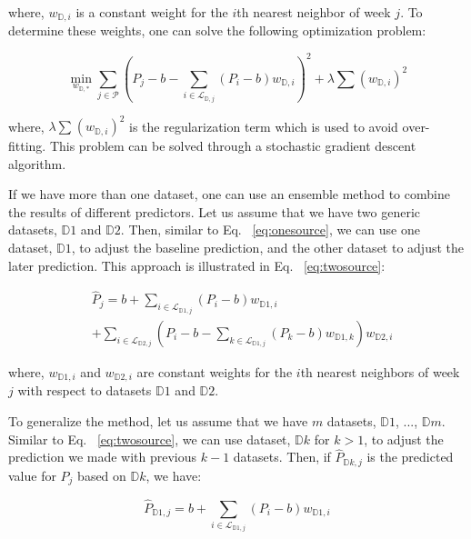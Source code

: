 where, $w_{\mathbb{D},i}$ is a constant weight for the $i$th nearest neighbor of week $j$. To determine these weights, one can solve the following optimization problem:

\begin{equation}
\min_{w_{\mathbb{D},*}} \sum_{j \in \mathcal{P}} {(P_j - b - \sum_{i \in \mathcal{L}_{\mathbb{D},j}}{} (P_i - b)w_{\mathbb{D},i})^2} + \lambda \sum_{}{}{{(w_{\mathbb{D},i})}^2}
\end{equation}

where, $\lambda \sum_{}{}{{(w_{\mathbb{D},i})}^2}$ is the regularization term which is used to avoid over-fitting. This problem can be solved through a stochastic gradient descent algorithm.

If we have more than one dataset, one can use an ensemble method to combine the results of different predictors. Let us assume that we have two generic datasets, $\mathbb{D}1$ and $\mathbb{D}2$. Then, similar to Eq. ~\ref{eq:onesource}, we can use one dataset, $\mathbb{D}1$, to adjust the baseline prediction, and the other dataset to adjust the later prediction. This approach is illustrated in Eq. ~\ref{eq:twosource}:

\begin{equation}
\begin{array}{ll}
& \hat{P}_{j} =  b + \sum_{i \in \mathcal{L}_{\mathbb{D}1,j}}{} (P_i - b)w_{\mathbb{D}1,i} \\
 & + \sum_{i \in \mathcal{L}_{\mathbb{D}2,j}}{} (P_i - b - \sum_{k \in \mathcal{L}_{\mathbb{D}1,j}}{} (P_k - b)w_{\mathbb{D}1,k})w_{\mathbb{D}2,i}
\end{array}
\label{eq:twosource}
\end{equation}

where, $w_{\mathbb{D}1,i}$ and $w_{\mathbb{D}2,i}$ are constant weights for the $i$th nearest neighbors of week $j$ with respect to datasets $\mathbb{D}1$ and $\mathbb{D}2$. 

To generalize the method, let us assume that we have $m$ datasets, $\mathbb{D}1$, ...,  $\mathbb{D}m$. Similar to Eq. ~\ref{eq:twosource}, we can use dataset, $\mathbb{D}k$ for $k>1$, to adjust the prediction we made with previous $k-1$ datasets. Then, if $\hat{P}_{\mathbb{D}k,j}$ is the predicted value for $P_j$ based on $\mathbb{D}k$, we have:

\begin{equation}
\hat{P}_{\mathbb{D}1,j} = b + \sum_{i \in \mathcal{L}_{\mathbb{D}1,j}}{} (P_i - b)w_{\mathbb{D}1,i} 
\label{eq:manysource1}
\end{equation}

